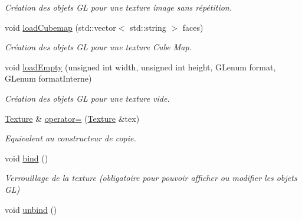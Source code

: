 \begin{DoxyCompactItemize}
\begin{DoxyCompactList}\small\item\em Création des objets G\-L pour une texture image sans répétition. \end{DoxyCompactList}\item 
\hypertarget{classTexture_a006028bb4f1c28b731260ce24a7ba263}{void \hyperlink{classTexture_a006028bb4f1c28b731260ce24a7ba263}{load\-Cubemap} (std\-::vector$<$ std\-::string $>$ faces)}\label{classTexture_a006028bb4f1c28b731260ce24a7ba263}

\begin{DoxyCompactList}\small\item\em Création des objets G\-L pour une texture Cube Map. \end{DoxyCompactList}\item 
\hypertarget{classTexture_a041fd824a637b8c02df9564cb96ee53e}{void \hyperlink{classTexture_a041fd824a637b8c02df9564cb96ee53e}{load\-Empty} (unsigned int width, unsigned int height, G\-Lenum format, G\-Lenum format\-Interne)}\label{classTexture_a041fd824a637b8c02df9564cb96ee53e}

\begin{DoxyCompactList}\small\item\em Création des objets G\-L pour une texture vide. \end{DoxyCompactList}\item 
\hypertarget{classTexture_a18a767fcb0c2648f5c4f3bbc6ac06fc5}{\hyperlink{classTexture}{Texture} \& \hyperlink{classTexture_a18a767fcb0c2648f5c4f3bbc6ac06fc5}{operator=} (\hyperlink{classTexture}{Texture} \&tex)}\label{classTexture_a18a767fcb0c2648f5c4f3bbc6ac06fc5}

\begin{DoxyCompactList}\small\item\em Equivalent au constructeur de copie. \end{DoxyCompactList}\item 
\hypertarget{classTexture_a3840dc7429982ffaddeafc8d62345b5d}{void \hyperlink{classTexture_a3840dc7429982ffaddeafc8d62345b5d}{bind} ()}\label{classTexture_a3840dc7429982ffaddeafc8d62345b5d}

\begin{DoxyCompactList}\small\item\em Verrouillage de la texture (obligatoire pour pouvoir afficher ou modifier les objets G\-L) \end{DoxyCompactList}\item 
\hypertarget{classTexture_a8480eed7ed703a937c3e6ab528f559bd}{void \hyperlink{classTexture_a8480eed7ed703a937c3e6ab528f559bd}{unbind} ()}\label{classTexture_a8480eed7ed703a937c3e6ab528f559bd}


\end{DoxyCompactItemize}
